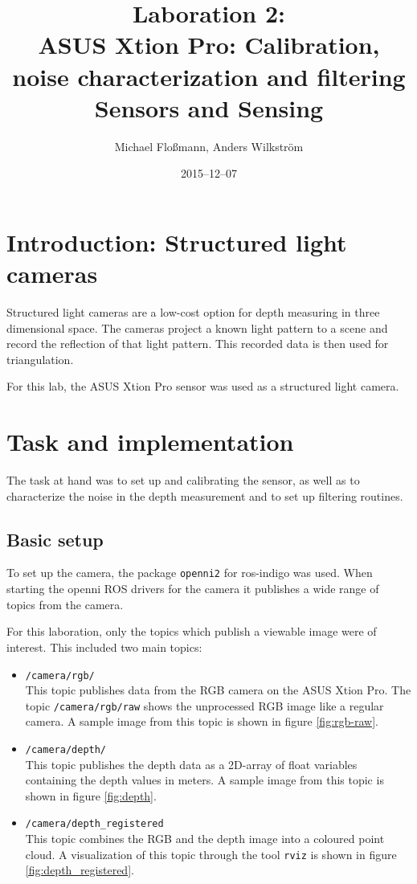 \documentclass[DIV12,a4paper]{scrartcl}
\title{Laboration 2:\\ ASUS Xtion Pro: Calibration, noise characterization and filtering\\{\small Sensors and Sensing}}
\author{Michael Flo{\ss}mann, Anders Wilkstr\"om}
\date{2015--12--07}
\begin{document}
\maketitle

\section{Introduction: Structured light cameras}
Structured light cameras are a low-cost option for depth measuring in three dimensional space. The cameras project a known light pattern to a scene and record the reflection of that light pattern. This recorded data is then used for triangulation.\par
For this lab, the ASUS Xtion Pro sensor was used as a structured light camera.
\section{Task and implementation}
The task at hand was to set up and calibrating the sensor, as well as to characterize the noise in the depth measurement and to set up filtering routines.
\subsection{Basic setup}
To set up the camera, the package \texttt{openni2} for ros-indigo was used. %
When starting the openni ROS drivers for the camera it publishes a wide range of topics from the camera.\par %
For this laboration, only the topics which publish a viewable image were of interest. This included two main topics:%


\begin{itemize}
  \item \texttt{/camera/rgb/}\\
    This topic publishes data from the RGB camera on the ASUS Xtion Pro. The topic \texttt{/camera/rgb/raw} shows the unprocessed RGB image like a regular camera. A sample image from this topic is shown in figure \ref{fig:rgb-raw}.
  \item \texttt{/camera/depth/}\\
    This topic publishes the depth data as a 2D-array of float variables containing the depth values in meters. A sample image from this topic is shown in figure \ref{fig:depth}.
  \item \texttt{/camera/depth\_registered}\\
    This topic combines the RGB and the depth image into a coloured point cloud. A visualization of this topic through the tool \texttt{rviz} is shown in figure \ref{fig:depth_registered}.
\end{itemize}
\end{document}
